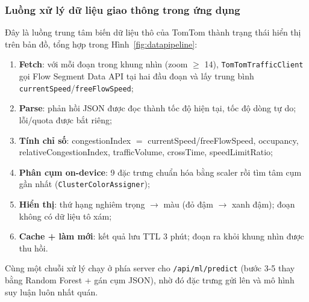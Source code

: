 \subsubsection{Luồng xử lý dữ liệu giao thông trong ứng dụng}
Đây là luồng trung tâm biến dữ liệu thô của TomTom thành trạng thái hiển thị trên bản đồ, tổng hợp trong Hình~\ref{fig:datapipeline}:
\begin{enumerate}[label=\textbf{Bước \arabic*.},leftmargin=2.2cm,itemsep=1pt]
 \item \textbf{Fetch}: với mỗi đoạn trong khung nhìn (zoom $\ge$ 14), \texttt{TomTomTrafficClient} gọi Flow Segment Data API tại hai đầu đoạn và lấy trung bình \texttt{currentSpeed}/\texttt{freeFlowSpeed};
 \item \textbf{Parse}: phản hồi JSON được đọc thành tốc độ hiện tại, tốc độ dòng tự do; lỗi/quota được bắt riêng;
 \item \textbf{Tính chỉ số}: congestionIndex $=$ currentSpeed/freeFlowSpeed, occupancy, relativeCongestionIndex, trafficVolume, crossTime, speedLimitRatio;
 \item \textbf{Phân cụm on-device}: 9 đặc trưng chuẩn hóa bằng scaler rồi tìm tâm cụm gần nhất (\texttt{ClusterColorAssigner});
 \item \textbf{Hiển thị}: thứ hạng nghiêm trọng $\rightarrow$ màu (đỏ đậm $\rightarrow$ xanh đậm); đoạn không có dữ liệu tô xám;
 \item \textbf{Cache + làm mới}: kết quả lưu TTL 3 phút; đoạn ra khỏi khung nhìn được thu hồi.
\end{enumerate}
Cùng một chuỗi xử lý chạy ở phía server cho \texttt{/api/ml/predict} (bước 3-5 thay bằng Random Forest + gán cụm JSON), nhờ đó đặc trưng gửi lên và mô hình suy luận luôn nhất quán.

